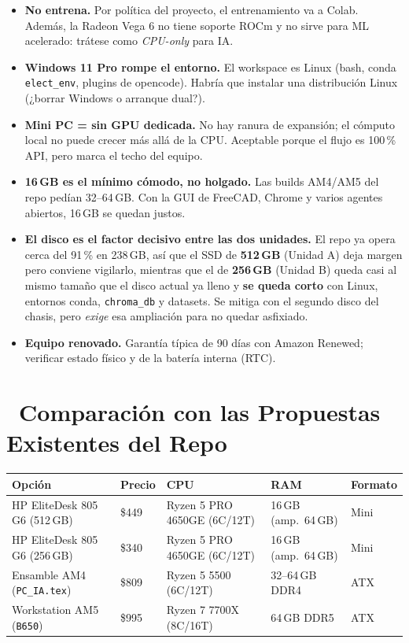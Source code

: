 \documentclass[11pt,a4paper]{article}
\newcommand{\iconotexto}[2]{\textcolor{cyanNeon}{\faIcon{#1}}~#2}
\begin{document}
\begin{tcolorbox}[cajaMejora, title={\faIcon{ban}~Lo que hay que asumir}]
\begin{itemize}
    \item \textbf{No entrena.} Por política del proyecto, el entrenamiento va a Colab.
    Además, la Radeon Vega 6 no tiene soporte ROCm y no sirve para ML acelerado:
    trátese como \emph{CPU-only} para IA.
    \item \textbf{Windows 11 Pro rompe el entorno.} El workspace es Linux (bash,
    conda \texttt{elect\_env}, plugins de opencode). Habría que instalar una
    distribución Linux (¿borrar Windows o arranque dual?).
    \item \textbf{Mini PC = sin GPU dedicada.} No hay ranura de expansión; el cómputo
    local no puede crecer más allá de la CPU. Aceptable porque el flujo es 100\,\% API,
    pero marca el techo del equipo.
    \item \textbf{16\,GB es el mínimo cómodo, no holgado.} Las builds AM4/AM5 del repo
    pedían 32--64\,GB. Con la GUI de FreeCAD, Chrome y varios agentes abiertos, 16\,GB
    se quedan justos.
    \item \textbf{El disco es el factor decisivo entre las dos unidades.} El repo ya opera
    cerca del 91\,\% en 238\,GB, así que el SSD de \textbf{512\,GB} (Unidad A) deja margen
    pero conviene vigilarlo, mientras que el de \textbf{256\,GB} (Unidad B) queda casi al
    mismo tamaño que el disco actual ya lleno y \textbf{se queda corto} con Linux, entornos
    conda, \texttt{chroma\_db} y datasets. Se mitiga con el segundo disco del chasis, pero
    \emph{exige} esa ampliación para no quedar asfixiado.
    \item \textbf{Equipo renovado.} Garantía típica de 90 días con Amazon Renewed;
    verificar estado físico y de la batería interna (RTC).
\end{itemize}
\end{tcolorbox}

\section[Comparación con las Propuestas]{\iconotexto{balance-scale}{Comparación con las Propuestas Existentes del Repo}}

\begin{longtable}{p{3.4cm} p{1.8cm} p{3.6cm} p{2.3cm} p{2.6cm}}
\toprule
\textbf{Opción} & \textbf{Precio} & \textbf{CPU} & \textbf{RAM} & \textbf{Formato} \\
\midrule
\endhead
\bottomrule
\endlastfoot
HP EliteDesk 805 G6 (512\,GB) & \$449 & Ryzen 5 PRO 4650GE (6C/12T) & 16\,GB (amp.\ 64\,GB) & Mini \\
HP EliteDesk 805 G6 (256\,GB) & \$340 & Ryzen 5 PRO 4650GE (6C/12T) & 16\,GB (amp.\ 64\,GB) & Mini \\
Ensamble AM4 (\texttt{PC\_IA.tex}) & \$809 & Ryzen 5 5500 (6C/12T) & 32--64\,GB DDR4 & ATX \\
Workstation AM5 (\texttt{B650}) & \$995 & Ryzen 7 7700X (8C/16T) & 64\,GB DDR5 & ATX \\
\bottomrule
\end{longtable}
\end{document}
